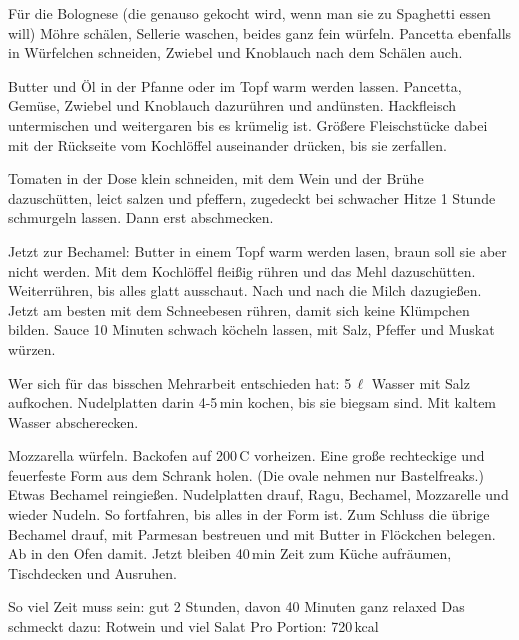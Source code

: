\begin{Notes}
  \item F\"{u}r die Bolognese (die genauso gekocht wird, wenn man sie zu
    Spaghetti essen will) M\"{o}hre sch\"{a}len, Sellerie waschen, beides ganz
    fein w\"{u}rfeln. Pancetta ebenfalls in W\"{u}rfelchen schneiden, Zwiebel
    und Knoblauch nach dem Sch\"{a}len auch.

  \item Butter und \"{O}l in der Pfanne oder im Topf warm werden lassen.
    Pancetta, Gem\"{u}se, Zwiebel und Knoblauch dazur\"{u}hren und
    and\"{u}nsten. Hackfleisch untermischen und weitergaren bis es kr\"{u}melig
    ist. Gr\"{o}{\ss}ere Fleischst\"{u}cke dabei mit der R\"{u}ckseite vom
    Kochl\"{o}ffel auseinander dr\"{u}cken, bis sie zerfallen.
    
  \item Tomaten in der Dose klein schneiden, mit dem Wein und der Br\"{u}he
    dazusch\"{u}tten, leict salzen und pfeffern, zugedeckt bei schwacher Hitze 1
    Stunde schmurgeln lassen. Dann erst abschmecken.

  \item Jetzt zur Bechamel: Butter in einem Topf warm werden lasen, braun soll
    sie aber nicht werden. Mit dem Kochl\"{o}ffel flei{\ss}ig r\"{u}hren und das
    Mehl dazusch\"{u}tten. Weiterr\"{u}hren, bis alles glatt ausschaut. Nach und
    nach die Milch dazugie{\ss}en. Jetzt am besten mit dem Schneebesen
    r\"{u}hren, damit sich keine Kl\"{u}mpchen bilden. Sauce 10 Minuten schwach
    k\"{o}cheln lassen, mit Salz, Pfeffer und Muskat w\"{u}rzen.
    
  \item Wer sich f\"{u}r das bisschen Mehrarbeit entschieden hat: 5\,$\ell$
    Wasser mit Salz aufkochen. Nudelplatten darin 4-5\,min kochen, bis sie
    biegsam sind. Mit kaltem Wasser abscherecken.

  \item Mozzarella w\"{u}rfeln. Backofen auf 200\textdegree\,C vorheizen. Eine
    gro{\ss}e rechteckige und feuerfeste Form aus dem Schrank holen. (Die ovale
    nehmen nur Bastelfreaks.) Etwas Bechamel reingie{\ss}en. Nudelplatten drauf,
    Ragu, Bechamel, Mozzarelle und wieder Nudeln. So fortfahren, bis alles in
    der Form ist. Zum Schluss die \"{u}brige Bechamel drauf, mit Parmesan
    bestreuen und mit Butter in Fl\"{o}ckchen belegen. Ab in den Ofen damit.
    Jetzt bleiben 40\,min Zeit zum K\"{u}che aufr\"{a}umen, Tischdecken und
    Ausruhen.

\end{Notes}
So viel Zeit muss sein: gut 2 Stunden, davon 40 Minuten ganz relaxed \newline
Das schmeckt dazu: Rotwein und viel Salat
Pro Portion: 720\,kcal
